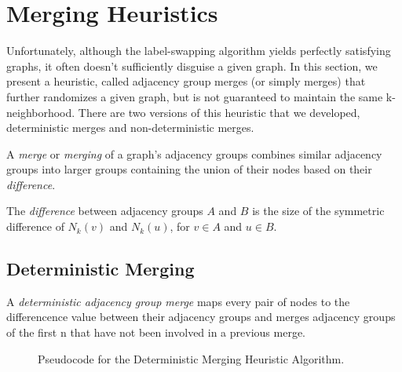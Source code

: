 \section{Merging Heuristics}
\indent Unfortunately, although the label-swapping algorithm yields perfectly satisfying graphs, it often doesn't sufficiently disguise a given graph.  In this section, we present a heuristic, called adjacency group merges (or simply merges) that further randomizes a given graph, but is not guaranteed to maintain the same k-neighborhood. There are two versions of this heuristic that we developed, deterministic merges and non-deterministic merges.

\begin{definition}
\noindent A \emph{merge} or \emph{merging} of a graph's adjacency groups combines similar adjacency groups into larger groups containing the union of their nodes based on their \emph{difference}.
\end{definition}

\begin{definition}
The \emph{difference} between adjacency groups $A$ and $B$ is the size of the symmetric difference of $N_k(v)$ and $N_k(u)$, for $v \in A$ and $u \in B$. 
\end{definition}

\subsection{Deterministic Merging}

\begin{definition}
A \emph{deterministic adjacency group merge} maps every pair of nodes to  the differencence value between their adjacency groups and merges adjacency groups of the first n that have not been involved in a previous merge.
\end{definition}

\begin{figure}[H]
	\begin{algorithmic}
		\renewcommand{\algorithmicrequire}{\textbf{Input:}}
		\renewcommand{\algorithmicensure}{\textbf{Output:}}
			\EndFor
		\EndFor
		\EndFor
			\EndIf
		\EndIf
	\end{algorithmic}
	\caption{Pseudocode for the Deterministic Merging Heuristic Algorithm.}
	\label{fig:deterministic-merging}
\end{figure}

